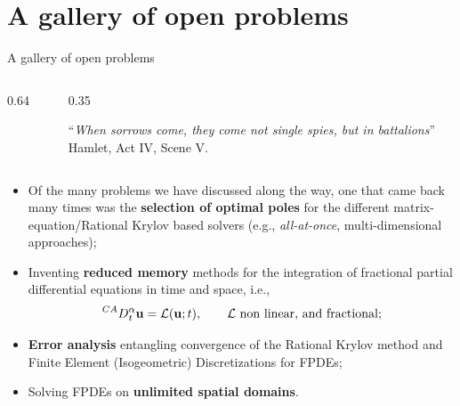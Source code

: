 \documentclass[aspectratio=169,xcolor=dvipsnames]{beamer}
\begin{document}
	\section{A gallery of open problems}
	
	\begin{frame}{\faBinoculars\;A gallery of open problems}
	
	\begin{columns}
	\begin{column}{0.64\columnwidth}
	
	\end{column}
	\begin{column}{0.35\columnwidth}\begin{flushright}\small
	``\emph{When sorrows come, they come not single spies, but in battalions}'' \\ Hamlet, Act IV, Scene V.
	\end{flushright}
	\end{column}
	\end{columns}

	\begin{itemize}
	\item[\faBinoculars] Of the many problems we have discussed along the way, one that came back many times was the \alert{\textbf{selection of optimal poles}} for the different matrix-equation/Rational Krylov based solvers (e.g., \emph{all-at-once}, multi-dimensional approaches);
	\item[\faBinoculars]<2-> Inventing \alert{\textbf{reduced memory}} methods for the integration of fractional partial differential equations in time and space, i.e.,
	\[
	\prescript{CA}{}{D}^\alpha_t \mathbf{u} = \mathcal{L}(\mathbf{u};t), \qquad \mathcal{L} \text{ non linear, and fractional};
	\]
	\item[\faBinoculars]<3-> \alert{\textbf{Error analysis}} entangling convergence of the Rational Krylov method and Finite Element (Isogeometric) Discretizations for FPDEs;
	\item[\faBinoculars]<4-> Solving FPDEs on \alert{\textbf{unlimited spatial domains}}.
	\end{itemize}
	
	\end{frame}
\end{document}
